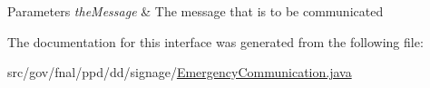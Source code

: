 \begin{DoxyParams}{Parameters}
{\em the\-Message} & The message that is to be communicated \\
\hline
\end{DoxyParams}


The documentation for this interface was generated from the following file\-:\begin{DoxyCompactItemize}
\item 
src/gov/fnal/ppd/dd/signage/\hyperlink{EmergencyCommunication_8java}{Emergency\-Communication.\-java}\end{DoxyCompactItemize}
